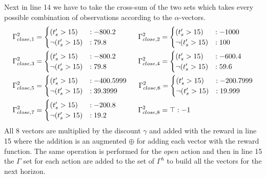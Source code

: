 \documentclass{article} %
\begin{document}
Next in line 14 we have to take the cross-sum of the two sets which takes every possible combination of observations according to the $\alpha$-vectors. 
\begin{align*}
\Gamma_{close,1}^2 &= 
\begin{cases} 
(t_s'>15) &: -800.2 \\ 
\neg(t_s'>15) &: 79.8 \\
\end{cases}
\hspace{10mm} 
\Gamma_{close,2}^2= 
\begin{cases} 
(t_s'>15) &: -1000 \\ 
\neg(t_s'>15) &: 100 \\
\end{cases}
\\
\Gamma_{close,3}^2&= 
\begin{cases} 
(t_s'>15) &: -800.2 \\ 
\neg(t_s'>15) &: 79.8 \\
\end{cases}
\hspace{10mm}
\Gamma_{close,4}^2= 
\begin{cases} 
(t_s'>15) &: -600.4 \\ 
\neg(t_s'>15) &: 59.6 \\
\end{cases}
\\
\Gamma_{close,5}^2&= 
\begin{cases} 
(t_s'>15) &: -400.5999 \\ 
\neg(t_s'>15) &: 39.3999 \\
\end{cases}
\hspace{5mm} 
\Gamma_{close,6}^2= 
\begin{cases} 
(t_s'>15) &: -200.7999 \\ 
\neg(t_s'>15) &: 19.999 \\
\end{cases}
\\
\Gamma_{close,7}^2&= 
\begin{cases} 
(t_s'>15) &: -200.8 \\ 
\neg(t_s'>15) &: 19.2 \\
\end{cases}
\hspace{10mm} 
\Gamma_{close,8}^2= \top:-1
\end{align*}
All 8 vectors are multiplied by the discount $\gamma$ and added with the reward in line 15 where the addition is an augmented $\oplus$ for adding each vector with the reward function. 
The same operation is performed for the $open$ action and then in line 15 the $\Gamma$ set for each action are added to the set of $\Gamma^h$ to build all the vectors for the next horizon. 
\end{document}
